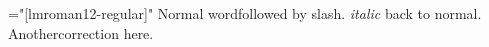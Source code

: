 \font\x="[lmroman12-regular]"
\x
Normal word\/followed by slash.
{\it italic\/} back to normal.
Another\/correction here.
\bye
